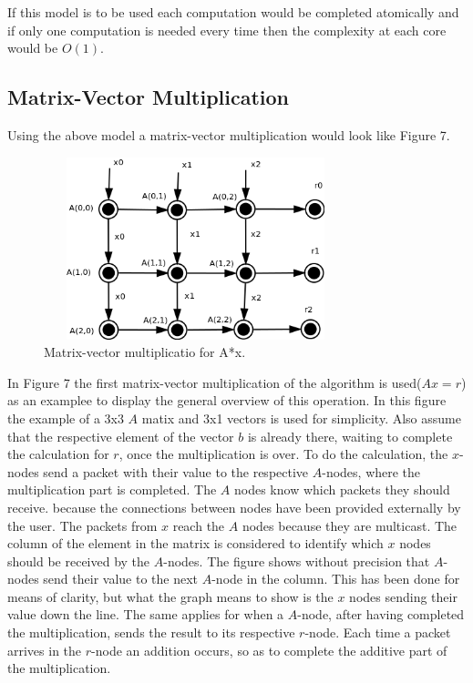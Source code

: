 \documentclass[12pt,a4paper]{article}
\begin{document}
If this model is to be used each computation would be completed atomically and if only one computation is needed every time then the complexity at each core would be $O(1)$.
\subsection{Matrix-Vector Multiplication}
Using the above model a matrix-vector multiplication would look like Figure 7. 
\begin{figure}[h!]
\includegraphics[width=250pt,height=150pt,scale=2]{Pics/mat0mult.png}
\centering
\caption{Matrix-vector multiplicatio for A*x.\cite{basicinterim}}
\end{figure}

In Figure 7 the first matrix-vector multiplication of the algorithm is used($Ax=r$) as an examplee to display the general overview of this operation. In this figure the example of a 3x3 $A$ matix and 3x1 vectors is used for simplicity. Also assume that the respective element of the vector $b$ is already there, waiting to complete the calculation for $r$, once the multiplication is over. To do the calculation, the $x$-nodes send a packet with their value to the respective $A$-nodes, where the multiplication part is completed. The $A$ nodes know which packets they should receive. because the connections between nodes have been provided externally by the user. The packets from $x$ reach the $A$ nodes because they are multicast. The column of the element in the matrix is considered to identify which $x$ nodes should be received by the $A$-nodes. The figure shows without precision that $A$-nodes send their value to the next $A$-node in the column. This has been done for means of clarity, but what the graph means to show is the $x$ nodes sending their value down the line. The same applies for when a $A$-node, after having completed the multiplication, sends the result to its respective $r$-node. Each time a packet arrives in the $r$-node an addition occurs, so as to complete the additive part of the multiplication. 
\end{document}
